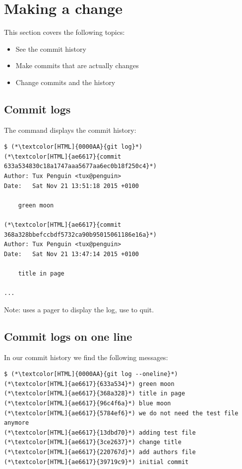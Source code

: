 \section{Making a change}
\begin{frame}[fragile]
  \slidetitle

  This section covers the following topics:
  \begin{itemize}
    \item See the commit history
    \item Make commits that are actually changes
    \item Change commits and the history
  \end{itemize}
\end{frame}

\subsection{Commit logs}
\begin{frame}[fragile]
  \subslidetitle

  The command  displays the commit history:
  \begin{lstlisting}
$ (*\textcolor[HTML]{0000AA}{git log}*)
(*\textcolor[HTML]{ae6617}{commit 633a534830c18a1747aaa5677aa6ec0b18f250c4}*)
Author: Tux Penguin <tux@penguin>
Date:   Sat Nov 21 13:51:18 2015 +0100

    green moon

(*\textcolor[HTML]{ae6617}{commit 368a328bbefccbdf5732ca90b95015061186e16a}*)
Author: Tux Penguin <tux@penguin>
Date:   Sat Nov 21 13:47:14 2015 +0100

    title in page

...
\end{lstlisting}
Note:  uses a pager to display the log, use  to quit.
\end{frame}

\subsection{Commit logs on one line}
\begin{frame}[fragile]
  \subslidetitle

  In our commit history we find the following messages:
  \begin{lstlisting}
$ (*\textcolor[HTML]{0000AA}{git log --oneline}*)
(*\textcolor[HTML]{ae6617}{633a534}*) green moon
(*\textcolor[HTML]{ae6617}{368a328}*) title in page
(*\textcolor[HTML]{ae6617}{96c4f6a}*) blue moon
(*\textcolor[HTML]{ae6617}{5784ef6}*) we do not need the test file anymore
(*\textcolor[HTML]{ae6617}{13dbd70}*) adding test file
(*\textcolor[HTML]{ae6617}{3ce2637}*) change title
(*\textcolor[HTML]{ae6617}{220767d}*) add authors file
(*\textcolor[HTML]{ae6617}{39719c9}*) initial commit
\end{lstlisting}
\end{frame}


